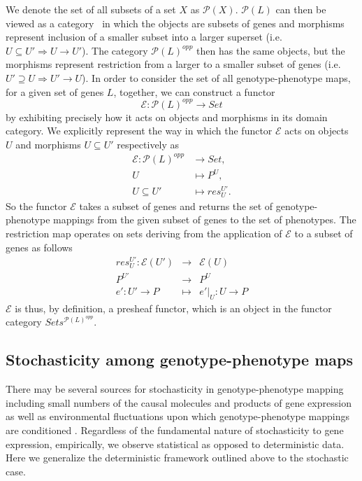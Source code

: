 We denote the set of all subsets of a set $X$ as $\mathcal{P}(X)$. $\mathcal{P}(L)$ can then be viewed as a category~\cite{Lane1998,MacLane1992,Awodey2006} in which the objects are subsets of genes and morphisms represent inclusion of a smaller subset into a larger superset (i.e. $U \subseteq U' \Rightarrow U \rightarrow U'$). The category $\mathcal{P}(L)^{opp}$ then has the same objects, but the morphisms represent restriction from a larger to a smaller subset of genes (i.e. $U' \supseteq U \Rightarrow U' \rightarrow U$). In order to consider the set of all genotype-phenotype maps, for a given set of genes $L$, together, we can construct a functor
$$
\mathcal{E} \colon \mathcal{P}(L)^{opp} \rightarrow Set
$$
by exhibiting precisely how it acts on objects and morphisms in its domain category. We explicitly represent the way in which the functor $\mathcal{E}$ acts on objects $U$ and morphisms $U \subseteq U'$ respectively as
\begin{equation}\label{eq:gpfunctor}
\begin{split}
\mathcal{E} \colon \mathcal{P}(L)^{opp} &\rightarrow Set,\\
U &\mapsto P^U,\\
U \subseteq U' &\mapsto res^{U'}_{U}.
\end{split}
\end{equation}
So the functor $\mathcal{E}$ takes a subset of genes and returns the set of genotype-phenotype mappings from the given subset of genes to the set of phenotypes. The restriction map operates on sets deriving from the application of $\mathcal{E}$ to a subset of genes as follows
\begin{eqnarray*}
res^{U'}_{U} \colon \mathcal{E}(U') &\rightarrow& \mathcal{E}(U)\\
P^{U'} &\rightarrow& P^U\\
e' \colon U' \rightarrow P &\mapsto& e'|_U \colon U \rightarrow P
\end{eqnarray*}
$\mathcal{E}$ is thus, by definition, a presheaf functor, which is an object in the functor category $Sets^{\mathcal{P}(L)^{opp}}$.

\subsection*{Stochasticity among genotype-phenotype maps}
There may be several sources for stochasticity in genotype-phenotype mapping including small numbers of the causal molecules and products of gene expression as well as environmental fluctuations upon which genotype-phenotype mappings are conditioned \cite{Swain2002,Paulsson2004,Thattai2004,Acar2008a,Lestas2010,Munsky2012,Chalancon2012,Neuert2013,Sanchez2013}. Regardless of the fundamental nature of stochasticity to gene expression, empirically, we observe statistical as opposed to deterministic data. Here we generalize the deterministic framework outlined above to the stochastic case.

